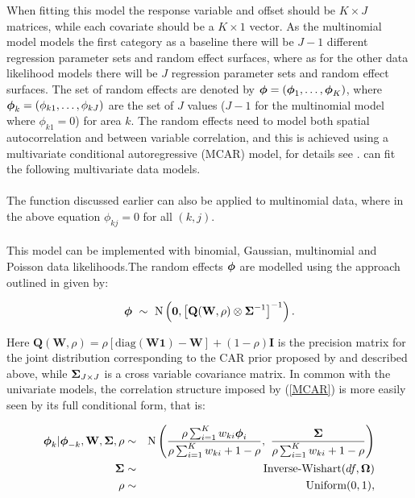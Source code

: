 \documentclass[article,shortnames,nojss]{jss}
\newcommand{\bd}[1]{\ensuremath{\mbox{\boldmath $#1$}}}
\begin{document}
When fitting this model the response variable and offset should be $K\times J$ matrices, while each covariate should be a $K\times 1$ vector. As the multinomial model models the first category as a baseline there will be $J-1$ different regression parameter sets and random effect surfaces, where as for the other data likelihood models there will be $J$ regression parameter sets and random effect surfaces. The set of random effects are denoted by $\bd{\phi}=(\bd{\phi}_1,\ldots,\bd{\phi}_{K})$, where $\bd{\phi}_{k}=(\phi_{k1},\ldots,\phi_{kJ})$ are the set of $J$ values ($J-1$ for the multinomial model where $\phi_{k1}=0$) for area $k$. The random effects need to model both spatial autocorrelation and between variable correlation, and this is achieved using a multivariate conditional autoregressive (MCAR) model, for details see \cite{gelfand2003}.  can fit the following multivariate data models.\\

\\
The  function discussed earlier can also be applied to multinomial data, where in the above equation $\phi_{kj}=0$ for all $(k,j)$.\\  


\\
This model can be implemented with binomial, Gaussian, multinomial and Poisson data likelihoods.The random effects $\bd{\phi}$ are modelled using the approach outlined in \cite{Kavanagh2016} given by:

\begin{equation}
\bd{\phi}~\sim~\mbox{N}\left(\mathbf{0},\left[\mathbf{Q}(\mathbf{W},\rho) \otimes \bd{\Sigma}^{-1}\right]^{-1}\right).
\label{MCAR}
\end{equation}


Here $\mathbf{Q}(\mathbf{W},\rho)=\rho[\mbox{diag}(\mathbf{W}\mathbf{1}) - \mathbf{W}] + (1-\rho)\mathbf{I}$ is the precision matrix for the joint distribution corresponding to the CAR prior proposed by \cite{leroux2000} and described above, while $\bd{\Sigma}_{J\times J}$ is a cross variable covariance matrix. In common with the univariate models, the correlation structure imposed by (\ref{MCAR}) is more easily seen by its full conditional form, that is:


\begin{eqnarray}
\bd{\phi}_{k}| \bd{\phi}_{-k},\mathbf{W},\bd{\Sigma}, \rho&\sim&\mbox{N}\left(\frac{\rho\sum_{i=1}^{K}w_{ki}\bd{\phi}_{i}}{\rho\sum_{i=1}^{K}w_{ki} + 1-\rho},~
\frac{\bd{\Sigma}}{\rho\sum_{i=1}^{K}w_{ki} + 1-\rho}\right)\nonumber\\
\bd{\Sigma}&\sim&\mbox{Inverse-Wishart}(df, \bd{\Omega})\nonumber\\
\rho&\sim&\mbox{Uniform}(0,1),\nonumber
\end{eqnarray}
\end{document}
